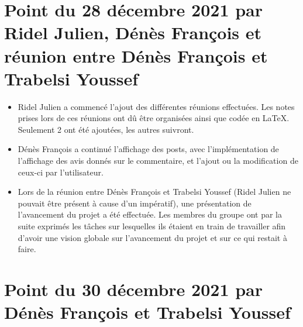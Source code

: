 \documentclass{article}
\begin{document}
\section{\huge Point du 28 décembre 2021 par Ridel Julien, Dénès François et réunion entre Dénès François et Trabelsi Youssef}

\begin{itemize}

    \item \Large Ridel Julien a commencé l'ajout des différentes réunions effectuées. Les notes prises lors de ces réunions ont dû être organisées ainsi que codée en LaTeX. Seulement 2 ont été ajoutées, les autres suivront.
    
    \item \Large Dénès François a continué l'affichage des posts, avec l'implémentation de l'affichage des avis donnés sur le commentaire, et l'ajout ou la modification de ceux-ci par l'utilisateur.

    \item \Large Lors de la réunion entre Dénès François et Trabelsi Youssef (Ridel Julien ne pouvait être présent à cause d'un impératif), une présentation de l'avancement du projet a été effectuée. Les membres du groupe ont par la suite exprimés les tâches sur lesquelles ils étaient en train de travailler afin d'avoir une vision globale sur l'avancement du projet et sur ce qui restait à faire.
    
\end{itemize}

\section{\huge Point du 30 décembre 2021 par Dénès François et Trabelsi Youssef}
\end{document}
